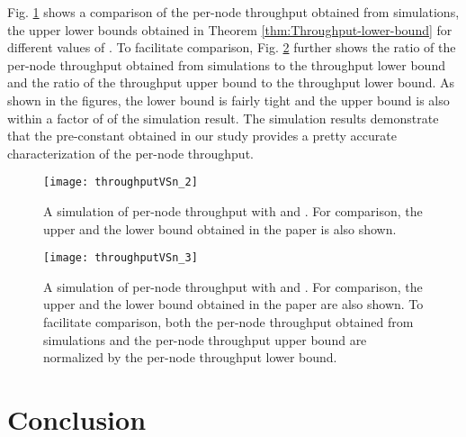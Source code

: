 \documentclass[english]{IEEEtran}
\theoremstyle{plain}
\theoremstyle{plain}
\theoremstyle{plain}
\theoremstyle{remark}
\begin{document}
Fig. \ref{fig:throughput} shows a comparison of the per-node throughput
obtained from simulations, the upper lower bounds obtained in Theorem
\ref{thm:Throughput-lower-bound} for different values of . To
facilitate comparison, Fig. \ref{fig:Tightness of two bounds} further
shows the ratio of the per-node throughput obtained from simulations
to the throughput lower bound and the ratio of the throughput upper
bound to the throughput lower bound. As shown in the figures, the
lower bound is fairly tight and the upper bound is also within a factor
of  of the simulation result. The simulation results demonstrate
that the pre-constant obtained in our study provides a pretty accurate
characterization of the per-node throughput.

\begin{figure}
\begin{centering}
\texttt{[image: throughputVSn\_2]}
\par\end{centering}

\protect\caption{\label{fig:throughput}A simulation of per-node throughput with 
and . For comparison, the upper and the lower bound obtained
in the paper is also shown.}
\end{figure}


\begin{figure}
\begin{centering}
\texttt{[image: throughputVSn\_3]}
\par\end{centering}

\protect\caption{\label{fig:Tightness of two bounds}A simulation of per-node throughput
with  and . For comparison, the upper and the
lower bound obtained in the paper are also shown. To facilitate comparison,
both the per-node throughput obtained from simulations and the per-node
throughput upper bound are normalized by the per-node throughput lower
bound.}
\end{figure}



\section{Conclusion\label{sec:Conclusion}}
\end{document}

